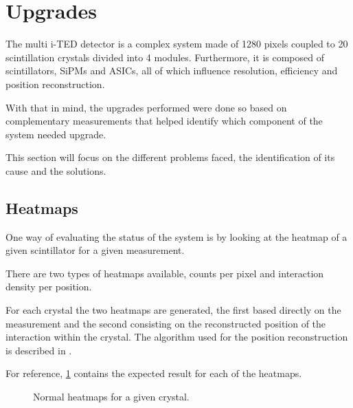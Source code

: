 \section{Upgrades}\label{sec:upgrades}

The multi \ac{i-TED} detector is a complex system made of 1280 pixels coupled to 20 scintillation crystals divided into 4 modules. Furthermore, it is composed of scintillators, \ac{SiPM}s and \ac{ASIC}s, all of which influence resolution, efficiency and position reconstruction.

With that in mind, the upgrades performed were done so based on complementary measurements that helped identify which component of the system needed upgrade.

This section will focus on the different problems faced, the identification of its cause and the solutions.

\subsection{Heatmaps}\label{ssec:heatmaps}

One way of evaluating the status of the system is by looking at the heatmap of a given scintillator for a given measurement.

There are two types of heatmaps available, counts per pixel and interaction density per position.

For each crystal the two heatmaps are generated, the first based directly on the measurement and the second consisting on the reconstructed position of the interaction within the crystal. The algorithm used for the position reconstruction is described in \cite{BABIANO20191, BALIBREACORREA2021165249}.

For reference, \ref{fig:NormalHeadtmap} contains the expected result for each of the heatmaps.

\begin{figure}[h!]
    \centering
    \qquad
    \caption{Normal heatmaps for a given crystal.}%
    \label{fig:NormalHeadtmap}%
\end{figure}

